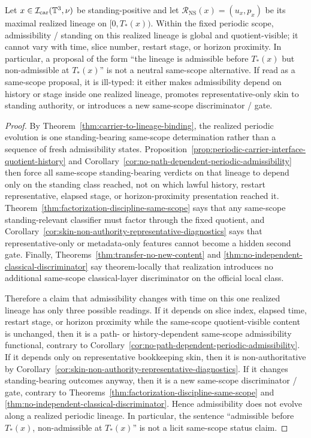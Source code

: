 \begin{manualtheorem}
\label{thm:no-admissibility-dynamics-realized-lineages}
Let $x\in\mathcal I_{\mathrm{car}}(\mathbb{T}^3,\nu)$ be standing-positive and let $\mathcal R_{\mathrm{NS}}(x)=(u_x,p_x)$ be its maximal realized lineage on $[0,T_*(x))$. Within the fixed periodic scope, admissibility / standing on this realized lineage is global and quotient-visible; it cannot vary with time, slice number, restart stage, or horizon proximity. In particular, a proposal of the form ``the lineage is admissible before $T_*(x)$ but non-admissible at $T_*(x)$'' is not a neutral same-scope alternative. If read as a same-scope proposal, it is ill-typed: it either makes admissibility depend on history or stage inside one realized lineage, promotes representative-only skin to standing authority, or introduces a new same-scope discriminator / gate.
\end{manualtheorem}

\begin{proof}
By Theorem~\ref{thm:carrier-to-lineage-binding}, the realized periodic evolution is one standing-bearing same-scope determination rather than a sequence of fresh admissibility states. Proposition~\ref{prop:periodic-carrier-interface-quotient-history} and Corollary~\ref{cor:no-path-dependent-periodic-admissibility} then force all same-scope standing-bearing verdicts on that lineage to depend only on the standing class reached, not on which lawful history, restart representative, elapsed stage, or horizon-proximity presentation reached it. Theorem~\ref{thm:factorization-discipline-same-scope} says that any same-scope standing-relevant classifier must factor through the fixed quotient, and Corollary~\ref{cor:skin-non-authority-representative-diagnostics} says that representative-only or metadata-only features cannot become a hidden second gate. Finally, Theorems~\ref{thm:transfer-no-new-content} and \ref{thm:no-independent-classical-discriminator} say theorem-locally that realization introduces no additional same-scope classical-layer discriminator on the official local class.

Therefore a claim that admissibility changes with time on this one realized lineage has only three possible readings. If it depends on slice index, elapsed time, restart stage, or horizon proximity while the same-scope quotient-visible content is unchanged, then it is a path- or history-dependent same-scope admissibility functional, contrary to Corollary~\ref{cor:no-path-dependent-periodic-admissibility}. If it depends only on representative bookkeeping skin, then it is non-authoritative by Corollary~\ref{cor:skin-non-authority-representative-diagnostics}. If it changes standing-bearing outcomes anyway, then it is a new same-scope discriminator / gate, contrary to Theorems~\ref{thm:factorization-discipline-same-scope} and \ref{thm:no-independent-classical-discriminator}. Hence admissibility does not evolve along a realized periodic lineage. In particular, the sentence ``admissible before $T_*(x)$, non-admissible at $T_*(x)$'' is not a licit same-scope status claim.
\end{proof}

